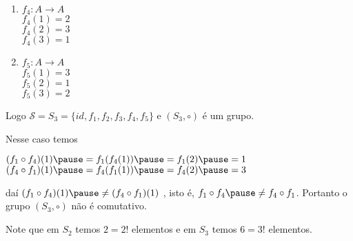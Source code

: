 \documentclass{beamer}
\begin{document}
\begin{frame}
\begin{multicols}{3}
\begin{enumerate}
                \vspace{.3cm}

                \item[] \begin{center}
                    $f_4 : A \to A$\pause\\
                    $f_4(1) = 2$\pause\\
                    $f_4(2) = 3$\pause\\
                    $f_4(3) = 1$
                \end{center}\pause

                \vspace{.3cm}

                \item[] \begin{center}
                    $f_5 : A \to A$\pause\\
                    $f_5(1) = 3$\pause\\
                    $f_5(2) = 1$\pause\\
                    $f_5(3) = 2$
                \end{center}
            \end{enumerate}
        \end{multicols}
    \end{frame}

    \begin{frame}
        Logo $\mathcal{S} = S_3 = \{id, f_1, f_2, f_3, f_4, f_5\}$ \pause e $(S_3, \circ)$ é um grupo.\pause

        \vspace{.3cm}

        Nesse caso temos\pause
        \begin{center}
            $(f_1 \circ f_4)(1) \pause = f_1(f_4(1)) \pause = f_1(2) \pause = 1$\pause\\
            \vspace{.3cm}
            $(f_4 \circ f_1)(1) \pause = f_4(f_1(1)) \pause = f_4(2) \pause = 3$\pause
        \end{center}
        daí $(f_1 \circ f_4)(1) \pause \ne (f_4 \circ f_1)(1)$ \pause, isto é, \pause $f_1 \circ f_4 \pause \ne f_4 \circ f_1$. \pause Portanto o grupo $(S_3, \circ)$ \pause não é comutativo.\pause

        \vspace{.3cm}

        Note que em $S_2$ \pause temos $2 = 2!$ elementos \pause e em $S_3$ \pause temos $6 = 3!$ elementos.\pause
    \end{frame}
\end{document}
